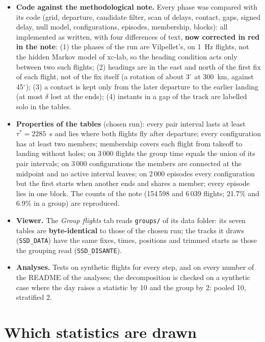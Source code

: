 \begin{itemize}
  \item \textbf{Code against the methodological note.} Every phase was compared with its code (grid, departure, candidate filter, scan of delays,
        contact, gaps, signed delay, null model, configurations, episodes, membership, blocks): all implemented as written, with four differences of text, \textbf{now
        corrected in red in the note}:
        (1) the phases of the run are Vilpellet's, on 1~Hz flights, not the hidden Markov model of xc-lab, so the heading condition acts only between two such flights;
        (2) headings are in the east and north of the first fix of each flight, not of the fix itself (a rotation of about $3^\circ$ at 300~km, against 45$^\circ$);
        (3) a contact is kept only from the later departure to the earlier landing (at most $\delta$ lost at the ends);
        (4) instants in a gap of the track are labelled solo in the tables.
  \item \textbf{Properties of the tables} (chosen run): every pair interval lasts at least $\tau^*=2285$~s and lies where both flights fly after departure; every configuration has at least
        two members; membership covers each flight from takeoff to landing without holes; on 3\,000 flights the group time equals the union of its pair intervals; on 3\,000 configurations the members are
        connected at the midpoint and no active interval leaves; on 2\,000 episodes every configuration but the first starts when another ends and shares a member; every episode lies in one block. The
        counts of the note (154\,598 and 6\,039 flights; 21.7\% and 6.9\% in a group) are reproduced.
  \item \textbf{Viewer.} The \emph{Group flights} tab reads \texttt{groups/} of its data folder: its seven tables are \textbf{byte-identical} to those of the chosen run; the tracks it draws (\texttt{SSD\_DATA}) have the same fixes,
        times, positions and trimmed starts as those the grouping read (\texttt{SSD\_DISANTE}).
  \item \textbf{Analyses.} Tests on synthetic flights for every step, and on every number of the README of the analyses; the decomposition is checked on a synthetic case where the day raises
        a statistic by 10 and the group by 2: pooled 10, stratified 2.
\end{itemize}

\section{Which statistics are drawn}\label{app:redundancy}

